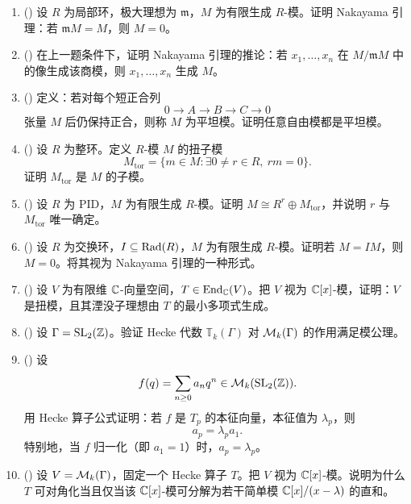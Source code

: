 \begin{enumerate}[label=\textbf{10.\arabic*.}, leftmargin=3.2em, start=46]
  \item (\hard) 设 $R$ 为局部环，极大理想为 $\mathfrak m$，$M$ 为有限生成 $R$-模。证明 Nakayama 引理：若 $\mathfrak m M=M$，则 $M=0$。

  \item (\hard) 在上一题条件下，证明 Nakayama 引理的推论：若 $x_1,\dots,x_n$ 在 $M/\mathfrak m M$ 中的像生成该商模，则 $x_1,\dots,x_n$ 生成 $M$。

  \item (\hard) 定义：若对每个短正合列
  \[
  0\to A\to B\to C\to 0
  \]
  张量 $M$ 后仍保持正合，则称 $M$ 为平坦模。证明任意自由模都是平坦模。

  \item (\hard) 设 $R$ 为整环。定义 $R$-模 $M$ 的扭子模
  \[
  M_{\mathrm{tor}}=\{m\in M:\exists 0\ne r\in R,\ rm=0\}.
  \]
  证明 $M_{\mathrm{tor}}$ 是 $M$ 的子模。

  \item (\hard) 设 $R$ 为 PID，$M$ 为有限生成 $R$-模。证明 $M\cong R^r\oplus M_{\mathrm{tor}}$，并说明 $r$ 与 $M_{\mathrm{tor}}$ 唯一确定。

  \item (\hard) 设 $R$ 为交换环，$I\subseteq \operatorname{Rad}(R)$，$M$ 为有限生成 $R$-模。证明若 $M=IM$，则 $M=0$。将其视为 Nakayama 引理的一种形式。

  \item (\hard) 设 $V$ 为有限维 $\mathbb{C}$-向量空间，$T\in \mathrm{End}_{\mathbb{C}}(V)$。把 $V$ 视为 $\mathbb{C}[x]$-模，证明：$V$ 是扭模，且其湮没子理想由 $T$ 的最小多项式生成。

  \item (\hard) 设 $\Gamma=\mathrm{SL}_2(\mathbb{Z})$。验证 Hecke 代数 $\mathbb T_k(\Gamma)$ 对 $\mathcal{M}_k(\Gamma)$ 的作用满足模公理。

  \item (\hard) 设
  \[
  f(q)=\sum_{n\ge 0} a_nq^n\in \mathcal{M}_k(\mathrm{SL}_2(\mathbb{Z})).
  \]
  用 Hecke 算子公式证明：若 $f$ 是 $T_p$ 的本征向量，本征值为 $\lambda_p$，则
  \[
  a_p=\lambda_p a_1.
  \]
  特别地，当 $f$ 归一化（即 $a_1=1$）时，$a_p=\lambda_p$。

  \item (\hard) 设 $V=\mathcal{M}_k(\Gamma)$，固定一个 Hecke 算子 $T$。把 $V$ 视为 $\mathbb{C}[x]$-模。说明为什么 $T$ 可对角化当且仅当该 $\mathbb{C}[x]$-模可分解为若干简单模 $\mathbb{C}[x]/(x-\lambda)$ 的直和。
\end{enumerate}

